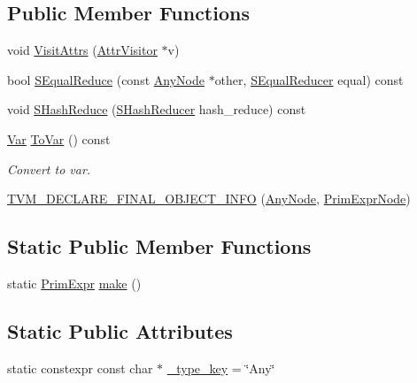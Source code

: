 \subsection*{Public Member Functions}
\begin{DoxyCompactItemize}
\item 
void \hyperlink{classtvm_1_1tir_1_1AnyNode_a170f1e5715fa8999068b7c878cf84b87}{Visit\+Attrs} (\hyperlink{classtvm_1_1AttrVisitor}{Attr\+Visitor} $\ast$v)
\item 
bool \hyperlink{classtvm_1_1tir_1_1AnyNode_aa68fadf8ba8d988e769326191a87f723}{S\+Equal\+Reduce} (const \hyperlink{classtvm_1_1tir_1_1AnyNode}{Any\+Node} $\ast$other, \hyperlink{classtvm_1_1SEqualReducer}{S\+Equal\+Reducer} equal) const 
\item 
void \hyperlink{classtvm_1_1tir_1_1AnyNode_aa4619aecf23ceefa065436ad0c001cba}{S\+Hash\+Reduce} (\hyperlink{classtvm_1_1SHashReducer}{S\+Hash\+Reducer} hash\+\_\+reduce) const 
\item 
\hyperlink{classtvm_1_1tir_1_1Var}{Var} \hyperlink{classtvm_1_1tir_1_1AnyNode_ac4acdd164527dde5e3f6afe37ee4f707}{To\+Var} () const 
\begin{DoxyCompactList}\small\item\em Convert to var. \end{DoxyCompactList}\item 
\hyperlink{classtvm_1_1tir_1_1AnyNode_a259c2acee554a58fe3daaf75fa0afb4e}{T\+V\+M\+\_\+\+D\+E\+C\+L\+A\+R\+E\+\_\+\+F\+I\+N\+A\+L\+\_\+\+O\+B\+J\+E\+C\+T\+\_\+\+I\+N\+FO} (\hyperlink{classtvm_1_1tir_1_1AnyNode}{Any\+Node}, \hyperlink{classtvm_1_1PrimExprNode}{Prim\+Expr\+Node})
\end{DoxyCompactItemize}
\subsection*{Static Public Member Functions}
\begin{DoxyCompactItemize}
\item 
static \hyperlink{classtvm_1_1PrimExpr}{Prim\+Expr} \hyperlink{classtvm_1_1tir_1_1AnyNode_ac5fa74bb8d0f075ea162d2f03cdb9332}{make} ()
\end{DoxyCompactItemize}
\subsection*{Static Public Attributes}
\begin{DoxyCompactItemize}
\item 
static constexpr const char $\ast$ \hyperlink{classtvm_1_1tir_1_1AnyNode_a864f1da6e9ec91a2c6986438fb64981f}{\+\_\+type\+\_\+key} = \char`\"{}Any\char`\"{}
\end{DoxyCompactItemize}
